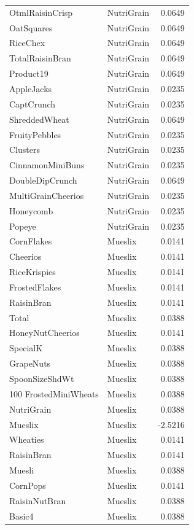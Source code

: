 \begin{longtable}{llr}
OtmlRaisinCrisp & NutriGrain & 0.0649 \\
OatSquares & NutriGrain & 0.0649 \\
RiceChex & NutriGrain & 0.0649 \\
TotalRaisinBran & NutriGrain & 0.0649 \\
Product19 & NutriGrain & 0.0649 \\
AppleJacks & NutriGrain & 0.0235 \\
CaptCrunch & NutriGrain & 0.0235 \\
ShreddedWheat & NutriGrain & 0.0649 \\
FruityPebbles & NutriGrain & 0.0235 \\
Clusters & NutriGrain & 0.0235 \\
CinnamonMiniBuns & NutriGrain & 0.0235 \\
DoubleDipCrunch & NutriGrain & 0.0649 \\
MultiGrainCheerios & NutriGrain & 0.0235 \\
Honeycomb & NutriGrain & 0.0235 \\
Popeye & NutriGrain & 0.0235 \\
CornFlakes & Mueslix & 0.0141 \\
Cheerios & Mueslix & 0.0141 \\
RiceKrispies & Mueslix & 0.0141 \\
FrostedFlakes & Mueslix & 0.0141 \\
RaisinBran & Mueslix & 0.0141 \\
Total & Mueslix & 0.0388 \\
HoneyNutCheerios & Mueslix & 0.0141 \\
SpecialK & Mueslix & 0.0388 \\
GrapeNuts & Mueslix & 0.0388 \\
SpoonSizeShdWt & Mueslix & 0.0388 \\
100%
FrostedMiniWheats & Mueslix & 0.0388 \\
NutriGrain & Mueslix & 0.0388 \\
Mueslix & Mueslix & -2.5216 \\
Wheaties & Mueslix & 0.0141 \\
RaisinBran & Mueslix & 0.0141 \\
Muesli & Mueslix & 0.0388 \\
CornPops & Mueslix & 0.0141 \\
RaisinNutBran & Mueslix & 0.0388 \\
Basic4 & Mueslix & 0.0388 \\

\end{longtable}
